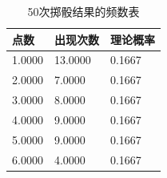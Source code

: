 \begin{table}[htbp]
\centering
\caption{50次掷骰结果的频数表}
\label{tab:ch3-dice-count}
\begin{tabular}{lll}
\hline
点数 & 出现次数 & 理论概率
\\
\hline
1.0000 & 13.0000 & 0.1667
\\
2.0000 & 7.0000 & 0.1667
\\
3.0000 & 8.0000 & 0.1667
\\
4.0000 & 9.0000 & 0.1667
\\
5.0000 & 9.0000 & 0.1667
\\
6.0000 & 4.0000 & 0.1667
\\
\hline
\end{tabular}
\end{table}

